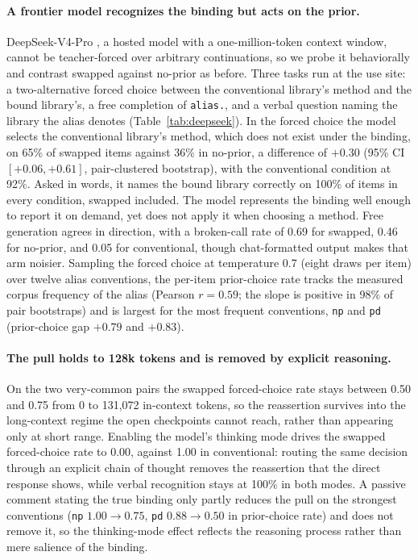 \documentclass[11pt]{article}
\begin{document}
\paragraph{A frontier model recognizes the binding but acts on the prior.} DeepSeek-V4-Pro \citep{deepseekai2026deepseekv4}, a hosted model with a one-million-token context window, cannot be teacher-forced over arbitrary continuations, so we probe it behaviorally and contrast swapped against no-prior as before. Three tasks run at the use site: a two-alternative forced choice between the conventional library's method and the bound library's, a free completion of \texttt{alias.}, and a verbal question naming the library the alias denotes (Table~\ref{tab:deepseek}). In the forced choice the model selects the conventional library's method, which does not exist under the binding, on 65\% of swapped items against 36\% in no-prior, a difference of $+0.30$ (95\% CI $[+0.06, +0.61]$, pair-clustered bootstrap), with the conventional condition at 92\%. Asked in words, it names the bound library correctly on 100\% of items in every condition, swapped included. The model represents the binding well enough to report it on demand, yet does not apply it when choosing a method. Free generation agrees in direction, with a broken-call rate of 0.69 for swapped, 0.46 for no-prior, and 0.05 for conventional, though chat-formatted output makes that arm noisier. Sampling the forced choice at temperature 0.7 (eight draws per item) over twelve alias conventions, the per-item prior-choice rate tracks the measured corpus frequency of the alias (Pearson $r=0.59$; the slope is positive in 98\% of pair bootstraps) and is largest for the most frequent conventions, \texttt{np} and \texttt{pd} (prior-choice gap $+0.79$ and $+0.83$).

\paragraph{The pull holds to 128k tokens and is removed by explicit reasoning.} On the two very-common pairs the swapped forced-choice rate stays between 0.50 and 0.75 from 0 to 131{,}072 in-context tokens, so the reassertion survives into the long-context regime the open checkpoints cannot reach, rather than appearing only at short range. Enabling the model's thinking mode \citep{deepseekai2026deepseekv4,guo2025deepseekr1} drives the swapped forced-choice rate to 0.00, against 1.00 in conventional: routing the same decision through an explicit chain of thought \citep{wei2022chain} removes the reassertion that the direct response shows, while verbal recognition stays at 100\% in both modes. A passive comment stating the true binding only partly reduces the pull on the strongest conventions (\texttt{np} $1.00\!\to\!0.75$, \texttt{pd} $0.88\!\to\!0.50$ in prior-choice rate) and does not remove it, so the thinking-mode effect reflects the reasoning process rather than mere salience of the binding.
\end{document}

